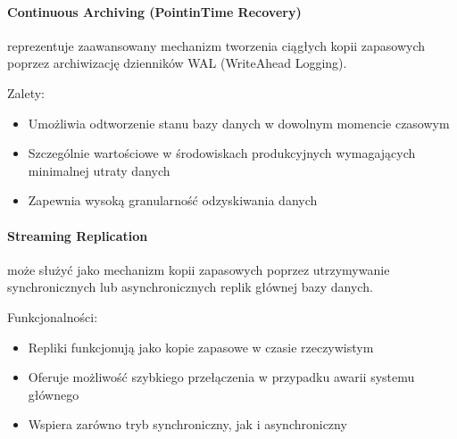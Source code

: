 \documentclass[letterpaper,10pt,polish]{sphinxmanual}
\begin{document}
\paragraph{Continuous Archiving (Point\sphinxhyphen{}in\sphinxhyphen{}Time Recovery)}
\label{\detokenize{rozdzial2/Kopie_zapasowe_i_odzyskiwanie_danych/kopie_zapasowe_i_odzyskiwanie_danych:continuous-archiving-point-in-time-recovery}}
\sphinxAtStartPar
{} reprezentuje zaawansowany mechanizm tworzenia ciągłych kopii zapasowych poprzez archiwizację dzienników WAL (Write\sphinxhyphen{}Ahead Logging).

\sphinxAtStartPar
Zalety:
\begin{itemize}
\item {} 
\sphinxAtStartPar
Umożliwia odtworzenie stanu bazy danych w dowolnym momencie czasowym

\item {} 
\sphinxAtStartPar
Szczególnie wartościowe w środowiskach produkcyjnych wymagających minimalnej utraty danych

\item {} 
\sphinxAtStartPar
Zapewnia wysoką granularność odzyskiwania danych

\end{itemize}


\paragraph{Streaming Replication}
\label{\detokenize{rozdzial2/Kopie_zapasowe_i_odzyskiwanie_danych/kopie_zapasowe_i_odzyskiwanie_danych:streaming-replication}}
\sphinxAtStartPar
{} może służyć jako mechanizm kopii zapasowych poprzez utrzymywanie synchronicznych lub asynchronicznych replik głównej bazy danych.

\sphinxAtStartPar
Funkcjonalności:
\begin{itemize}
\item {} 
\sphinxAtStartPar
Repliki funkcjonują jako kopie zapasowe w czasie rzeczywistym

\item {} 
\sphinxAtStartPar
Oferuje możliwość szybkiego przełączenia w przypadku awarii systemu głównego

\item {} 
\sphinxAtStartPar
Wspiera zarówno tryb synchroniczny, jak i asynchroniczny

\end{itemize}
\end{document}
